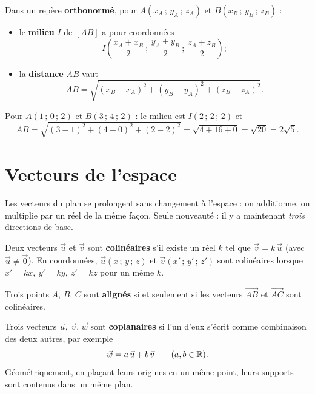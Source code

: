 \begin{propriete}
Dans un repère \textbf{orthonormé}, pour $A(x_A\,;\,y_A\,;\,z_A)$ et
$B(x_B\,;\,y_B\,;\,z_B)$ :
\begin{itemize}
  \item le \textbf{milieu} $I$ de $[AB]$ a pour coordonnées
        \[ I\!\left(\frac{x_A+x_B}{2}\,;\,\frac{y_A+y_B}{2}\,;\,\frac{z_A+z_B}{2}\right); \]
  \item la \textbf{distance} $AB$ vaut
        \[ AB=\sqrt{(x_B-x_A)^2+(y_B-y_A)^2+(z_B-z_A)^2}. \]
\end{itemize}
\end{propriete}

\begin{exemple}
Pour $A(1\,;\,0\,;\,2)$ et $B(3\,;\,4\,;\,2)$ : le milieu est $I(2\,;\,2\,;\,2)$ et
\[ AB=\sqrt{(3-1)^2+(4-0)^2+(2-2)^2}=\sqrt{4+16+0}=\sqrt{20}=2\sqrt{5}. \]
\end{exemple}

\section{Vecteurs de l'espace}

Les vecteurs du plan se prolongent sans changement à l'espace : on additionne, on
multiplie par un réel de la même façon. Seule nouveauté : il y a maintenant
\emph{trois} directions de base.

\begin{definition}[Colinéarité]
Deux vecteurs $\vec{u}$ et $\vec{v}$ sont \textbf{colinéaires} s'il existe un réel
$k$ tel que $\vec{v}=k\,\vec{u}$ (avec $\vec{u}\neq\vec{0}$). En coordonnées,
$\vec{u}(x\,;\,y\,;\,z)$ et $\vec{v}(x'\,;\,y'\,;\,z')$ sont colinéaires lorsque
$x'=kx,\ y'=ky,\ z'=kz$ pour un même $k$.
\end{definition}

\begin{propriete}
Trois points $A$, $B$, $C$ sont \textbf{alignés} si et seulement si les vecteurs
$\overrightarrow{AB}$ et $\overrightarrow{AC}$ sont colinéaires.
\end{propriete}

\begin{definition}
Trois vecteurs $\vec{u}$, $\vec{v}$, $\vec{w}$ sont \textbf{coplanaires} si l'un
d'eux s'écrit comme combinaison des deux autres, par exemple
\[ \vec{w}=a\,\vec{u}+b\,\vec{v}\qquad (a,b\in\mathbb{R}). \]
Géométriquement, en plaçant leurs origines en un même point, leurs supports sont
contenus dans un même plan.
\end{definition}

